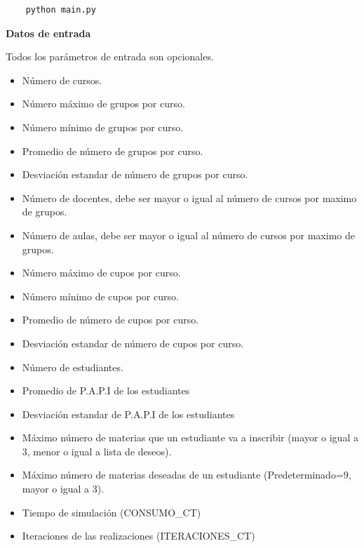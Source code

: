 \documentclass{article}
\begin{document}
\begin{center}
  \begin{adjustbox}{minipage=\linewidth, center}
  \begin{verbatim}
    python main.py
  \end{verbatim}
  \end{adjustbox}
\end{center}

\textbf{Datos de entrada}

Todos los parámetros de entrada son opcionales.

\begin{itemize}
  \item Número de cursos.
  \item Número máximo de grupos por curso.
  \item Número mínimo de grupos por curso.
  \item Promedio de número de grupos por curso.
  \item Desviación estandar de número de grupos por curso.
  \item Número de docentes, debe ser mayor o igual al número de cursos por maximo de grupos.
  \item Número de aulas, debe ser mayor o igual al número de cursos por maximo de grupos.
  \item Número máximo de cupos por curso.
  \item Número mínimo de cupos por curso.
  \item Promedio de número de cupos por curso.
  \item Desviación estandar de número de cupos por curso.
  \item Número de estudiantes.
  \item Promedio de P.A.P.I de los estudiantes
  \item Desviación estandar de P.A.P.I de los estudiantes
  \item Máximo número de materias que un estudiante va a inscribir (mayor o igual a 3, 
        menor o igual a lista de deseos).
  \item Máximo número de materias deseadas de un estudiante (Predeterminado=9, 
        mayor o igual a 3).
  \item Tiempo de simulación (CONSUMO\_CT)
  \item Iteraciones de las realizaciones (ITERACIONES\_CT)
\end{itemize}


\end{document}
